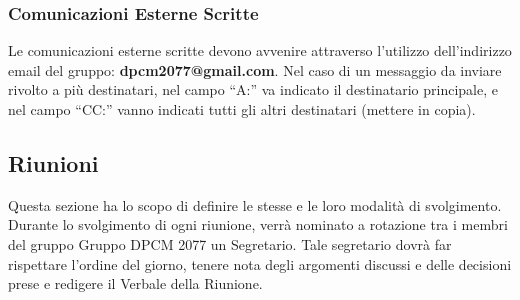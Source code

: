 \subsubsection{Comunicazioni Esterne Scritte}
Le comunicazioni esterne scritte devono avvenire attraverso l’utilizzo dell’indirizzo email del gruppo: \textbf{dpcm2077@gmail.com}. 
Nel caso di un messaggio da inviare rivolto a più destinatari, nel campo “A:” va indicato il destinatario principale, e nel campo “CC:” vanno indicati tutti gli altri destinatari (mettere in copia).

\subsection{Riunioni}
Questa sezione ha lo scopo di definire le stesse e le loro modalità di svolgimento. Durante lo svolgimento di ogni riunione, verrà nominato a rotazione tra i membri del gruppo Gruppo DPCM 2077 un Segretario. 
Tale segretario dovrà far rispettare l’ordine del giorno, tenere nota degli argomenti discussi e delle decisioni prese e redigere il Verbale della Riunione.

